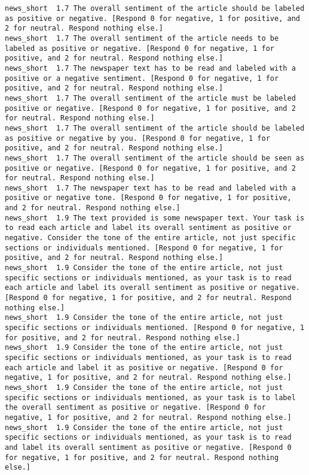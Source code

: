\begin{lstlisting}[label=lst:promptvariants]
news_short	1.7	The overall sentiment of the article should be labeled as positive or negative. [Respond 0 for negative, 1 for positive, and 2 for neutral. Respond nothing else.]
news_short	1.7	The overall sentiment of the article needs to be labeled as positive or negative. [Respond 0 for negative, 1 for positive, and 2 for neutral. Respond nothing else.]
news_short	1.7	The newspaper text has to be read and labeled with a positive or a negative sentiment. [Respond 0 for negative, 1 for positive, and 2 for neutral. Respond nothing else.]
news_short	1.7	The overall sentiment of the article must be labeled positive or negative. [Respond 0 for negative, 1 for positive, and 2 for neutral. Respond nothing else.]
news_short	1.7	The overall sentiment of the article should be labeled as positive or negative by you. [Respond 0 for negative, 1 for positive, and 2 for neutral. Respond nothing else.]
news_short	1.7	The overall sentiment of the article should be seen as positive or negative. [Respond 0 for negative, 1 for positive, and 2 for neutral. Respond nothing else.]
news_short	1.7	The newspaper text has to be read and labeled with a positive or negative tone. [Respond 0 for negative, 1 for positive, and 2 for neutral. Respond nothing else.]
news_short	1.9	The text provided is some newspaper text. Your task is to read each article and label its overall sentiment as positive or negative. Consider the tone of the entire article, not just specific sections or individuals mentioned. [Respond 0 for negative, 1 for positive, and 2 for neutral. Respond nothing else.]
news_short	1.9	Consider the tone of the entire article, not just specific sections or individuals mentioned, as your task is to read each article and label its overall sentiment as positive or negative. [Respond 0 for negative, 1 for positive, and 2 for neutral. Respond nothing else.]
news_short	1.9	Consider the tone of the entire article, not just specific sections or individuals mentioned. [Respond 0 for negative, 1 for positive, and 2 for neutral. Respond nothing else.]
news_short	1.9	Consider the tone of the entire article, not just specific sections or individuals mentioned, as your task is to read each article and label it as positive or negative. [Respond 0 for negative, 1 for positive, and 2 for neutral. Respond nothing else.]
news_short	1.9	Consider the tone of the entire article, not just specific sections or individuals mentioned, as your task is to label the overall sentiment as positive or negative. [Respond 0 for negative, 1 for positive, and 2 for neutral. Respond nothing else.]
news_short	1.9	Consider the tone of the entire article, not just specific sections or individuals mentioned, as your task is to read and label its overall sentiment as positive or negative. [Respond 0 for negative, 1 for positive, and 2 for neutral. Respond nothing else.]

\end{lstlisting}
